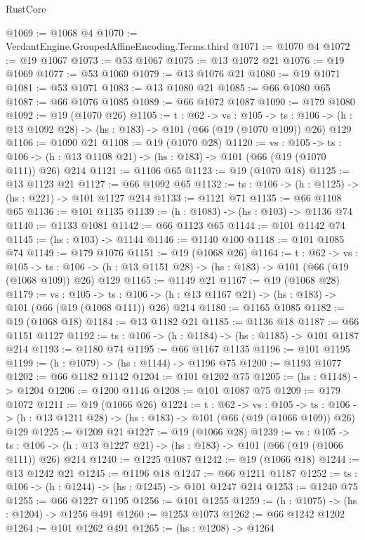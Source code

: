 \begin{lexlean}{RustCore}
\begin{coremodule}
@1069 := @1068 @4
@1070 := VerdantEngine.GroupedAffineEncoding.Terms.third
@1071 := @1070 @4
@1072 := @19 @1067
@1073 := @53 @1067
@1075 := @13 @1072 @21
@1076 := @19 @1069
@1077 := @53 @1069
@1079 := @13 @1076 @21
@1080 := @19 @1071
@1081 := @53 @1071
@1083 := @13 @1080 @21
@1085 := @66 @1080 @65
@1087 := @66 @1076 @1085
@1089 := @66 @1072 @1087
@1090 := @179 @1080
@1092 := @19 (@1070 @26)
@1105 := {t : @62} ->
  {vs : @105} ->
  {ts : @106} -> (h : @13 @1092 @28) -> (hs : @183) -> @101 (@66 (@19 (@1070 @109)) @26) @129
@1106 := @1090 @21
@1108 := @19 (@1070 @28)
@1120 := {vs : @105} ->
  {ts : @106} -> (h : @13 @1108 @21) -> (hs : @183) -> @101 (@66 (@19 (@1070 @111)) @26) @214
@1121 := @1106 @65
@1123 := @19 (@1070 @18)
@1125 := @13 @1123 @21
@1127 := @66 @1092 @65
@1132 := {ts : @106} -> (h : @1125) -> (hs : @221) -> @101 @1127 @214
@1133 := @1121 @71
@1135 := @66 @1108 @65
@1136 := @101 @1135
@1139 := (h : @1083) -> (hs : @103) -> @1136 @74
@1140 := @1133 @1081
@1142 := @66 @1123 @65
@1144 := @101 @1142 @74
@1145 := (hs : @103) -> @1144
@1146 := @1140 @100
@1148 := @101 @1085 @74
@1149 := @179 @1076
@1151 := @19 (@1068 @26)
@1164 := {t : @62} ->
  {vs : @105} ->
  {ts : @106} -> (h : @13 @1151 @28) -> (hs : @183) -> @101 (@66 (@19 (@1068 @109)) @26) @129
@1165 := @1149 @21
@1167 := @19 (@1068 @28)
@1179 := {vs : @105} ->
  {ts : @106} -> (h : @13 @1167 @21) -> (hs : @183) -> @101 (@66 (@19 (@1068 @111)) @26) @214
@1180 := @1165 @1085
@1182 := @19 (@1068 @18)
@1184 := @13 @1182 @21
@1185 := @1136 @18
@1187 := @66 @1151 @1127
@1192 := {ts : @106} -> (h : @1184) -> (hs : @1185) -> @101 @1187 @214
@1193 := @1180 @74
@1195 := @66 @1167 @1135
@1196 := @101 @1195
@1199 := (h : @1079) -> (hs : @1144) -> @1196 @75
@1200 := @1193 @1077
@1202 := @66 @1182 @1142
@1204 := @101 @1202 @75
@1205 := (hs : @1148) -> @1204
@1206 := @1200 @1146
@1208 := @101 @1087 @75
@1209 := @179 @1072
@1211 := @19 (@1066 @26)
@1224 := {t : @62} ->
  {vs : @105} ->
  {ts : @106} -> (h : @13 @1211 @28) -> (hs : @183) -> @101 (@66 (@19 (@1066 @109)) @26) @129
@1225 := @1209 @21
@1227 := @19 (@1066 @28)
@1239 := {vs : @105} ->
  {ts : @106} -> (h : @13 @1227 @21) -> (hs : @183) -> @101 (@66 (@19 (@1066 @111)) @26) @214
@1240 := @1225 @1087
@1242 := @19 (@1066 @18)
@1244 := @13 @1242 @21
@1245 := @1196 @18
@1247 := @66 @1211 @1187
@1252 := {ts : @106} -> (h : @1244) -> (hs : @1245) -> @101 @1247 @214
@1253 := @1240 @75
@1255 := @66 @1227 @1195
@1256 := @101 @1255
@1259 := (h : @1075) -> (hs : @1204) -> @1256 @491
@1260 := @1253 @1073
@1262 := @66 @1242 @1202
@1264 := @101 @1262 @491
@1265 := (hs : @1208) -> @1264

\end{coremodule}
\end{lexlean}
